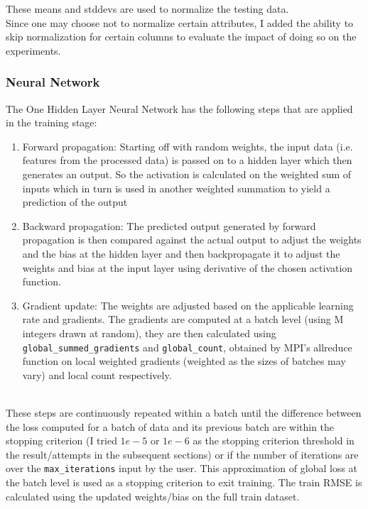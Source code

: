 \documentclass{article}
\begin{document}
These means and stddevs are used to normalize the testing data. \\

Since one may choose not to normalize certain attributes, I added the ability to skip normalization for certain columns to evaluate the impact of doing so on the experiments. \\

\subsubsection{Neural Network}
The One Hidden Layer Neural Network has the following steps that are applied in the training stage:
\begin{enumerate}
    \item Forward propagation: Starting off with random weights, the input data (i.e. features from the processed data) is passed on to a hidden layer which then generates an output. So the activation is calculated on the weighted sum of inputs which in turn is used in another weighted summation to yield a prediction of the output
    \item Backward propagation: The predicted output generated by forward propagation is then compared against the actual output to adjust the weights and the bias at the hidden layer and then backpropagate it to adjust the weights and bias at the input layer using derivative of the chosen activation function. 
    \item Gradient update: The weights are adjusted based on the applicable learning rate and gradients. The gradients are computed at a batch level (using M integers drawn at random), they are then calculated using \\ \verb|global_summed_gradients| and \verb|global_count|, obtained by MPI's allreduce function on local weighted gradients (weighted as the sizes of batches may vary) and local count respectively.
\end{enumerate} \\

These steps are continuously repeated within a batch until the difference between the loss computed for a batch of data and its previous batch are within the stopping criterion (I tried $1e-5$ or $1e-6$ as the stopping criterion threshold in the result/attempts in the subsequent sections) or if the number of iterations are over the \verb|max_iterations| input by the user. This approximation of global loss at the batch level is used as a stopping criterion to exit training. The train RMSE is calculated using the updated weights/bias on the full train dataset.
\end{document}
